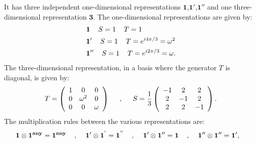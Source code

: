 \documentclass[a4paper,11pt]{article}
\begin{document}
It has three independent one-dimensional representations $\mathbf{1}$,$\mathbf{1'}$,$\mathbf{1''}$ and one three-dimensional representation $\mathbf{3}$. The one-dimensional representations are given by:
\begin{equation}
\begin{split}
&\mathbf{1}\hspace{4mm}S=1 \hspace{4mm} T=1\\
&\mathbf{1'}\hspace{4mm}S=1 \hspace{4mm} T=e^{i4\pi/3}=\omega^2\\
&\mathbf{1''} \hspace{4mm}S=1 \hspace{4mm}  T=e^{i2\pi/3}=\omega.
\end{split}
\end{equation}
The three-dimensional representation, in a basis where the generator $T$ is diagonal, is given by:
\begin{equation}
T = \left(\begin{array}{ccc} 1 & 0 & 0\\ 0 & \omega^2& 0\\ 0 & 0 & \omega\\\end{array}\right)\hspace{5mm},\hspace{5mm}
S = \frac{1}{3}\left(\begin{array}{ccc} -1 & 2 & 2\\ 2 & -1 & 2\\ 2 & 2 & -1\\\end{array}\right).
\end{equation}
The multiplication rules between the various representations are:
\begin{equation}
\begin{split}
&\mathbf{1}\otimes\mathbf{1^{any}}=\mathbf{1^{any}}\hspace{4mm},\hspace{4mm}\mathbf{1'}\otimes\mathbf{1^{'}}=\mathbf{1^{''}}\hspace{4mm},\hspace{4mm}\mathbf{1'}\otimes\mathbf{1''}=\mathbf{1}\hspace{4mm},\hspace{4mm}\mathbf{1''}\otimes\mathbf{1''}=\mathbf{1'},
\end{split}
\end{equation}
\end{document}
